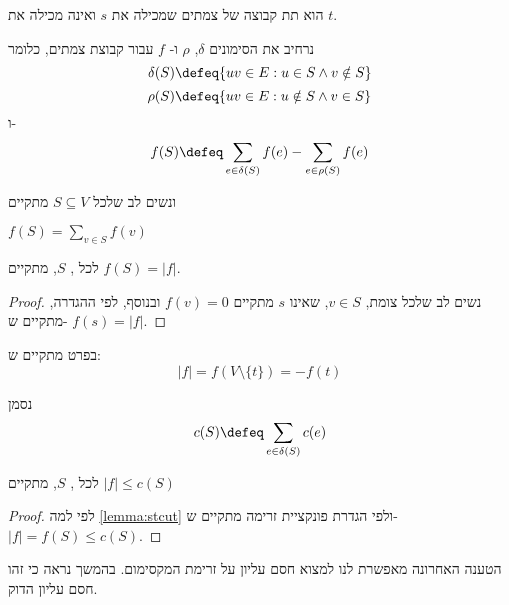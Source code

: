 \begin{definition}[\stcut]
\stcut{}
הוא תת קבוצה של צמתים שמכילה את $s$ ואינה מכילה את $t$.
\end{definition}

נרחיב את הסימונים 
$\delta$, $\rho$
ו-%
$f$
עבור קבוצת צמתים, כלומר
$$\delta(S) \defeq \{uv \in E : u \in S \land v \notin S\}$$
$$\rho(S) \defeq \{uv \in E : u \notin S \land v \in S\}$$
ו-%
$$f(S) \defeq \sum_{e \in \delta(S)} f(e) - \sum_{e \in \rho(S)} f(e)$$

ונשים לב שלכל 
$S \subseteq V$
מתקיים
\begin{observation}
$f(S) = \sum_{v \in S} f(v)$
\end{observation}

\begin{lemma}
\label{lemma:stcut}
לכל
\stcut, $S$,
מתקיים
$f(S) = |f|$.
\end{lemma}

\begin{proof}
נשים לב שלכל צומת, 
$v \in S$,
שאינו $s$ מתקיים 
$f(v) = 0$
ובנוסף, לפי ההגדרה, מתקיים ש-%
$f(s) = |f|$.
\end{proof}

בפרט מתקיים ש:%
$$
|f| = f(V \setminus \{t\}) = -f(t)
$$

נסמן
$$
c(S) \defeq \sum_{e \in \delta(S)} c(e)
$$

\begin{claim}
\label{claim:upper}
לכל 
\stcut, $S$,
מתקיים
$|f| \leq c(S)$
\end{claim}

\begin{proof}
לפי למה
\ref{lemma:stcut}
ולפי הגדרת פונקציית זרימה מתקיים ש-%
$|f| = f(S) \leq c(S)$.
\end{proof}

הטענה האחרונה מאפשרת לנו למצוא חסם עליון על זרימת המקסימום.
בהמשך נראה כי זהו חסם עליון הדוק.
